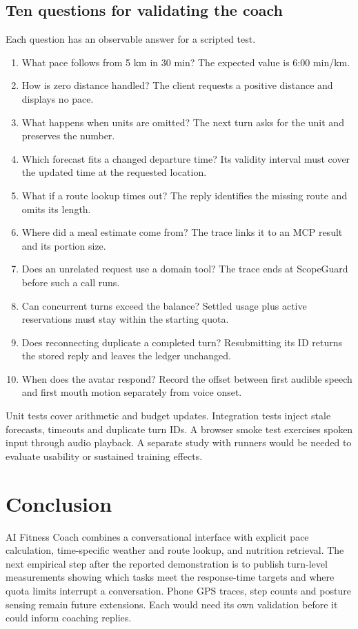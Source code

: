 \documentclass[conference]{IEEEtran}
\begin{document}
\subsection{Ten questions for validating the coach}
Each question has an observable answer for a scripted test.
\begin{enumerate}
\item What pace follows from 5 km in 30 min? The expected value is 6:00 min/km.
\item How is zero distance handled? The client requests a positive distance and displays no pace.
\item What happens when units are omitted? The next turn asks for the unit and preserves the number.
\item Which forecast fits a changed departure time? Its validity interval must cover the updated time at the requested location.
\item What if a route lookup times out? The reply identifies the missing route and omits its length.
\item Where did a meal estimate come from? The trace links it to an MCP result and its portion size.
\item Does an unrelated request use a domain tool? The trace ends at ScopeGuard before such a call runs.
\item Can concurrent turns exceed the balance? Settled usage plus active reservations must stay within the starting quota.
\item Does reconnecting duplicate a completed turn? Resubmitting its ID returns the stored reply and leaves the ledger unchanged.
\item When does the avatar respond? Record the offset between first audible speech and first mouth motion separately from voice onset.
\end{enumerate}
Unit tests cover arithmetic and budget updates. Integration tests inject stale forecasts, timeouts and duplicate turn IDs. A browser smoke test exercises spoken input through audio playback. A separate study with runners would be needed to evaluate usability or sustained training effects.

\section{Conclusion}
AI Fitness Coach combines a conversational interface with explicit pace calculation, time-specific weather and route lookup, and nutrition retrieval. The next empirical step after the reported demonstration is to publish turn-level measurements showing which tasks meet the response-time targets and where quota limits interrupt a conversation. Phone GPS traces, step counts and posture sensing remain future extensions. Each would need its own validation before it could inform coaching replies.
\end{document}
